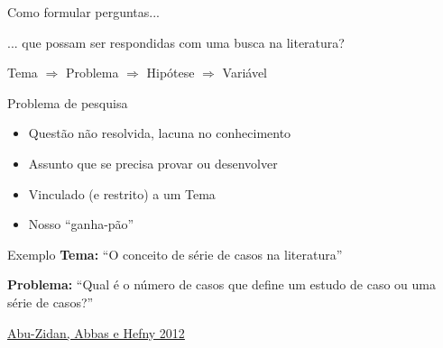 \documentclass{beamer}
\begin{document}
\begin{frame}
  \begin{center}
    Como formular perguntas...

    \bigskip
    ... que possam ser respondidas com uma busca na literatura?
  \end{center}
\end{frame}

\begin{frame}
  \begin{center}
    Tema $\Rightarrow$ Problema $\Rightarrow$ Hipótese $\Rightarrow$ Variável

    \bigskip
  \end{center}
\end{frame}

\begin{frame}{Problema de pesquisa}
  \begin{itemize}
    \footnotesize
  \item Questão não resolvida, lacuna no conhecimento
    \bigskip
  \item Assunto que se precisa provar ou desenvolver
    \bigskip
  \item Vinculado (e restrito) a um Tema
    \bigskip
  \item Nosso ``ganha-pão''
  \end{itemize}
\end{frame}

\begin{frame}
  \begin{exampleblock}{Exemplo}
    \small
    {\bf Tema:} ``O conceito de série de casos na literatura''

    \bigskip

    {\bf Problema:} ``Qual é o número de casos que define um estudo de caso ou uma série de casos?''
  \end{exampleblock}

  \vfill
  \scriptsize
  \hfill \href{http://dx.doi.org/10.4314/ahs.v12i4.25}{Abu-Zidan, Abbas e Hefny 2012}
\end{frame}
\end{document}
